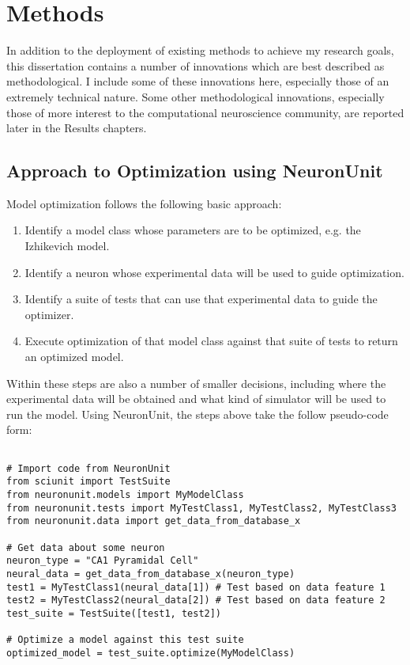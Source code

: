 \chapter{Methods}
In addition to the deployment of existing methods to achieve my research goals, this dissertation contains a number of innovations which are best described as methodological.  I include some of these innovations here, especially those of an extremely technical nature.  Some other methodological innovations, especially those of more interest to the computational neuroscience community, are reported later in the Results chapters.

\section{Approach to Optimization using NeuronUnit}
Model optimization follows the following basic approach:
\begin{enumerate}
	\item Identify a model class whose parameters are to be optimized, e.g. the Izhikevich model.
	\item Identify a neuron whose experimental data will be used to guide optimization.
	\item Identify a suite of tests that can use that experimental data to guide the optimizer.
	\item Execute optimization of that model class against that suite of tests to return an optimized model.
\end{enumerate}
Within these steps are also a number of smaller decisions, including where the experimental data will be obtained and what kind of simulator will be used to run the model.
Using NeuronUnit, the steps above take the follow pseudo-code form:
\clearpage
\begin{verbatim}

# Import code from NeuronUnit
from sciunit import TestSuite
from neuronunit.models import MyModelClass
from neuronunit.tests import MyTestClass1, MyTestClass2, MyTestClass3
from neuronunit.data import get_data_from_database_x

# Get data about some neuron
neuron_type = "CA1 Pyramidal Cell"
neural_data = get_data_from_database_x(neuron_type)
test1 = MyTestClass1(neural_data[1]) # Test based on data feature 1
test2 = MyTestClass2(neural_data[2]) # Test based on data feature 2
test_suite = TestSuite([test1, test2])

# Optimize a model against this test suite
optimized_model = test_suite.optimize(MyModelClass)
\end{verbatim}

